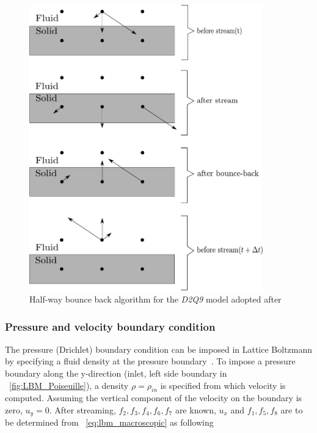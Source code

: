 \begin{figure}[htbp]
	\centering
	\includegraphics[width=0.9\textwidth]{bounce}
	\caption[Half-way bounce back algorithm for the \textit{D2Q9} model 
	]{Half-way 
	bounce back algorithm for the \textit{D2Q9} model adopted after 
	\citet{Sukop2006}}
	\label{fig:bounce}
\end{figure}

\subsubsection*{Pressure and velocity boundary condition}

The pressure (Drichlet) boundary condition can be imposed in Lattice Boltzmann 
by specifying a fluid density at the pressure boundary~\citep{Zou1997}. To 
impose a pressure boundary along the y-direction (inlet, left side boundary in 
~\cref{fig:LBM_Poiseuille}), a density $\rho = \rho_{in}$ is specified from 
which velocity is computed. Assuming the vertical component of the velocity on 
the boundary is zero, $u_y=0$. After streaming, $f_2, f_3, f_4, f_6, f_7$ are 
known, $u_x$ and $f_1, f_5, f_8$ are to be determined from 
~\cref{eq:lbm_macroscopic} as following

